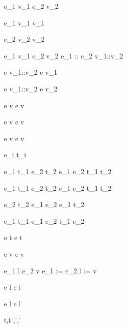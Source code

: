   {e_1 \eval v_1 \Quad
   e_2 \eval v_2}
  { \eval {}}

  {e_1 \eval v_1}
  {\Fst {} \eval v_1}

  {e_2 \eval v_2}
  {\Snd {} \eval v_2 }


  {e_1 \eval v_1 \Quad
   e_2 \eval v_2}
  {e_1 :: e_2 \eval v_1::v_2}

  {e \eval v_1::v_2}
  {\Head e \eval v_1}

{e \eval v_1::v_2}
{\Tail e \eval v_2}



  {e \eval v}
  {\Done e \eval \Done v}

  {}
  {\Enter \beta \eval \Enter \beta}

  {e \eval v}
  {\Update e \eval \Update v}

  {e \eval v}
  {\View e \eval \View v}

  { \Quad
   e_i \eval t_i}
  {\Pick{} \eval \Pick{}}


  {e_1 \eval t_1 \Quad
   e_2 \eval t_2}
  {e_1 \Pair e_2 \eval t_1 \Pair t_2}

  {e_1 \eval t_1 \Quad
   e_2 \eval t_2}
  {e_1 \Choose e_2 \eval t_1 \Choose t_2}


  {e_2 \eval t_2}
  {e_1 \Trans e_2 \eval e_1 \Trans t_2}

  {e_1 \eval t_1}
  {e_1 \Step e_2 \eval t_1 \Step e_2}

  {e \eval t}
  {\Forever e \eval \Forever t}


  {e \eval v}
  {\New e \eval \New v}

  {e_1 \eval l \Quad
   e_2 \eval v}
  {e_1 := e_2 \eval l := v}

  {e \eval l}
  {\Change e \eval \Change l}

  {e \eval l}
  {\Watch e \eval \Watch l}





  {t,\sigma \normalise t',\sigma',\delta'}



